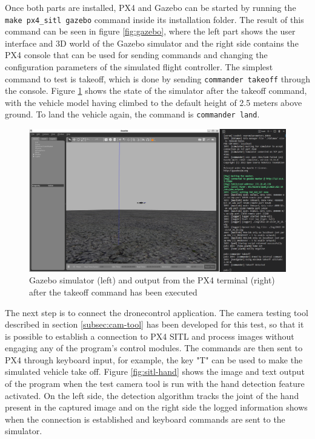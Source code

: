 Once both parts are installed, PX4 and Gazebo can be started by running the \texttt{make px4_sitl gazebo} command inside its installation folder.
The result of this command can be seen in figure \ref{fig:gazebo}, where the left part shows the user interface and 3D world of the Gazebo simulator and the right side contains the PX4 console that can be used for sending commands and changing the configuration parameters of the simulated flight controller.
The simplest command to test is takeoff, which is done by sending \texttt{commander takeoff} through the console.
Figure \ref{fig:gazebo-takeoff} shows the state of the simulator after the takeoff command, with the vehicle model having climbed to the default height of 2.5 meters above ground.
To land the vehicle again, the command is \texttt{commander land}.

\begin{figure}
  \centering
  \includegraphics[width=.8\textwidth, keepaspectratio]{img/gazebo-takeoff.png}
  \caption{Gazebo simulator (left) and output from the PX4 terminal (right) after the takeoff command has been executed}\label{fig:gazebo-takeoff}
\end{figure}

The next step is to connect the dronecontrol application.
The camera testing tool described in section \ref{subsec:cam-tool} has been developed for this test, so that it is possible to establish a connection to PX4 SITL and process images without engaging any of the program's control modules.
The commands are then sent to PX4 through keyboard input, for example, the key "T" can be used to make the simulated vehicle take off.
Figure \ref{fig:sitl-hand} shows the image and text output of the program when the test camera tool is run with the hand detection feature activated.
On the left side, the detection algorithm tracks the joint of the hand present in the captured image and on the right side the logged information shows when the connection is established and keyboard commands are sent to the simulator.

